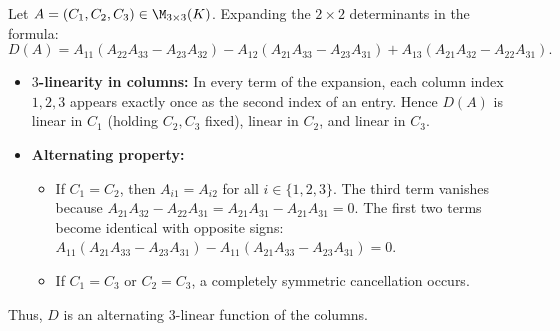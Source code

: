 \begin{exercisesolution}
\label{sol:laplace_expansion_3x3_alternating_trilinear}
Let $A = (C_1, C_2, C_3) \in \M_{3 \times 3}(K)$. Expanding the $2 \times 2$ determinants in the formula:
\[
D(A) = A_{11}(A_{22}A_{33} - A_{23}A_{32}) - A_{12}(A_{21}A_{33} - A_{23}A_{31}) + A_{13}(A_{21}A_{32} - A_{22}A_{31}).
\]
\begin{itemize}
    \item \textbf{$3$-linearity in columns:}
    In every term of the expansion, each column index $1, 2, 3$ appears exactly once as the second index of an entry.
    Hence $D(A)$ is linear in $C_1$ (holding $C_2, C_3$ fixed), linear in $C_2$, and linear in $C_3$.
    \item \textbf{Alternating property:}
    \begin{itemize}
        \item If $C_1 = C_2$, then $A_{i1} = A_{i2}$ for all $i \in \{1, 2, 3\}$.
        The third term vanishes because $A_{21}A_{32} - A_{22}A_{31} = A_{21}A_{31} - A_{21}A_{31} = 0$.
        The first two terms become identical with opposite signs:
        $A_{11}(A_{21}A_{33} - A_{23}A_{31}) - A_{11}(A_{21}A_{33} - A_{23}A_{31}) = 0$.
        \item If $C_1 = C_3$ or $C_2 = C_3$, a completely symmetric cancellation occurs.
    \end{itemize}
\end{itemize}
Thus, $D$ is an alternating $3$-linear function of the columns.
\end{exercisesolution}

